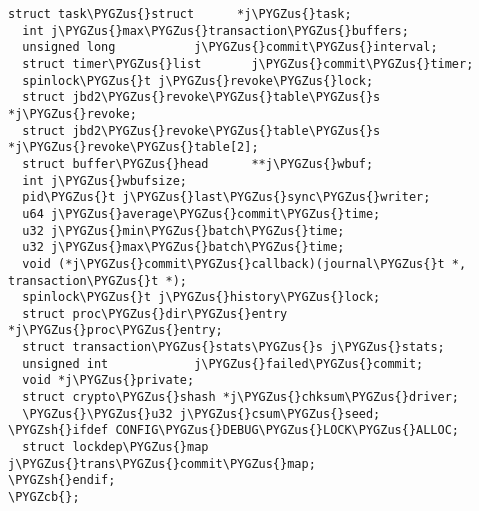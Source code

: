 \documentclass[a4paper,8pt,english]{sphinxmanual}
\def\PYGZus{\char`\_}
\def\PYGZcb{\char`\}}
\def\PYGZsh{\char`\#}
\begin{document}
\begin{Verbatim}[commandchars=\\\{\}]
  struct task\PYGZus{}struct      *j\PYGZus{}task;
  int j\PYGZus{}max\PYGZus{}transaction\PYGZus{}buffers;
  unsigned long           j\PYGZus{}commit\PYGZus{}interval;
  struct timer\PYGZus{}list       j\PYGZus{}commit\PYGZus{}timer;
  spinlock\PYGZus{}t j\PYGZus{}revoke\PYGZus{}lock;
  struct jbd2\PYGZus{}revoke\PYGZus{}table\PYGZus{}s *j\PYGZus{}revoke;
  struct jbd2\PYGZus{}revoke\PYGZus{}table\PYGZus{}s *j\PYGZus{}revoke\PYGZus{}table[2];
  struct buffer\PYGZus{}head      **j\PYGZus{}wbuf;
  int j\PYGZus{}wbufsize;
  pid\PYGZus{}t j\PYGZus{}last\PYGZus{}sync\PYGZus{}writer;
  u64 j\PYGZus{}average\PYGZus{}commit\PYGZus{}time;
  u32 j\PYGZus{}min\PYGZus{}batch\PYGZus{}time;
  u32 j\PYGZus{}max\PYGZus{}batch\PYGZus{}time;
  void (*j\PYGZus{}commit\PYGZus{}callback)(journal\PYGZus{}t *, transaction\PYGZus{}t *);
  spinlock\PYGZus{}t j\PYGZus{}history\PYGZus{}lock;
  struct proc\PYGZus{}dir\PYGZus{}entry   *j\PYGZus{}proc\PYGZus{}entry;
  struct transaction\PYGZus{}stats\PYGZus{}s j\PYGZus{}stats;
  unsigned int            j\PYGZus{}failed\PYGZus{}commit;
  void *j\PYGZus{}private;
  struct crypto\PYGZus{}shash *j\PYGZus{}chksum\PYGZus{}driver;
  \PYGZus{}\PYGZus{}u32 j\PYGZus{}csum\PYGZus{}seed;
\PYGZsh{}ifdef CONFIG\PYGZus{}DEBUG\PYGZus{}LOCK\PYGZus{}ALLOC;
  struct lockdep\PYGZus{}map      j\PYGZus{}trans\PYGZus{}commit\PYGZus{}map;
\PYGZsh{}endif;
\PYGZcb{};
\end{Verbatim}
\end{document}
